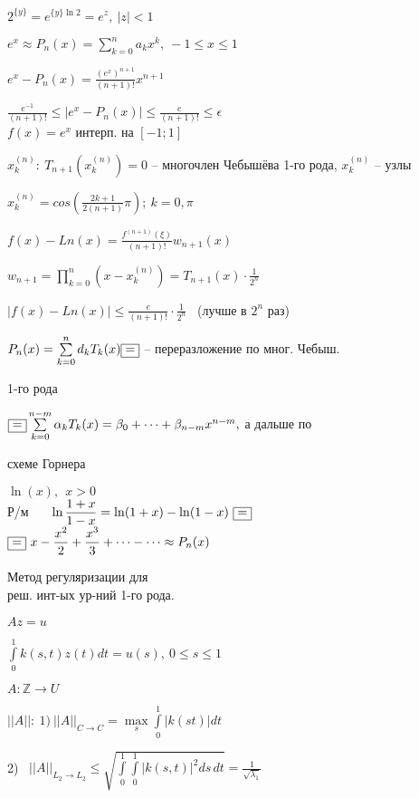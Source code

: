 \documentclass[12pt]{article}
\begin{document}
$2^{\{y\}} = e^{\{y\} \ln 2} = e^z, \ |z| < 1$

$e^x \approx P_n(x) = \sum\limits_{k=0}^n a_k x^k, \ -1 \leq x \leq 1$

$e^x - P_n(x) = \displaystyle{\frac{(e^x)^{n + 1}}{(n + 1)!}} x^{n + 1}$

$\displaystyle{\frac{e^{-1}}{(n + 1)!}} \leq |e^x - P_n(x)| \leq \displaystyle{\frac{e}{(n + 1)!}}
\leq \epsilon$
\\

$f(x) = e^x$ интерп. на $[-1; 1]$

$x_k^{(n)}\!: \ T_{n + 1}(x_k^{(n)}) = 0$ -- многочлен Чебышёва 1-го рода, $x_k^{(n)}$ -- узлы

$x_k^{(n)} = cos\left(\frac{2k + 1}{2(n + 1)}\pi\right); \ k = 0, \pi$

$f(x) - Ln(x) = \displaystyle{\frac{f^{(n + 1)}(\xi)}{(n + 1)!}}w_{n + 1}(x)$

$w_{n + 1} = \prod\limits_{k=0}^n (x - x_k^{(n)}) = T_{n + 1}(x)\cdot \displaystyle{\frac{1}{2^n}}$
\newpage



$|f(x) - Ln(x)| \leq \displaystyle{\frac{e}{(n + 1)!}}\cdot \displaystyle{\frac{1}{2^n}}$ \ (лучше в $2^n$ раз)

$P_n(x) = \sum\limits_{k=0}^n d_kT_k(x) \fbox{=}$ -- переразложение по мног. Чебыш.

{
\setlength{\leftskip}{10.9em}
1-го рода

}
$\fbox{=} \sum\limits_{k=0}^{n-m} \alpha_kT_k(x) = \beta_0 + \cdots + \beta_{n - m}x^{n - m}, $
а дальше по

{
\setlength{\leftskip}{20em}
схеме Горнера

}

$\ln (x), \ \ x > 0$
\\


Р/м \ \ \ $\ln \displaystyle{\frac{1 + x}{1 - x}} = \ln (1 + x) - \ln (1 - x) \ \fbox{=}$
\\

$\fbox{=}\ x - \displaystyle{\frac{x^2}{2}} + \displaystyle{\frac{x^3}{3}} + \cdots - \cdots \approx P_n(x)$

\begin{center}
Метод регуляризации для
\\

реш. инт-ых ур-ний 1-го рода.
\end{center}

$Az = u$

$\int\limits_0^1 k(s, t)z(t)dt = u(s), \ 0 \leq s \leq 1$

$A\!: \mathbb{Z} \rightarrow U$

$||A||\!: \ 1)\ ||A||_{C \rightarrow C} = \max\limits_s \int\limits_0^1 |k(s t)|dt$

2) \ $||A||_{L_2 \rightarrow L_2} \leq \sqrt{\int\limits_0^1 \int\limits_0^1 |k(s, t)|^2ds\, dt} = 
\displaystyle{\frac{1}{\sqrt{\lambda_1}}}$
\end{document}
